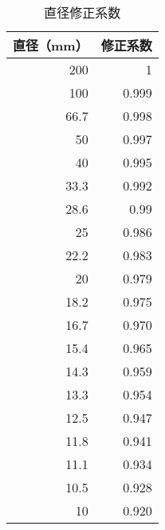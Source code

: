 \documentclass[12pt]{ctexart}
\begin{document}
\newpage
\begin{table}[h]
	\centering
	\caption{直径修正系数}
	\label{tab:diamension correction factors}
	\begin{tabular}{|r|r|}
	\hline
	\textbf{直径（mm）}   & \textbf{修正系数}  \\ \hline
	200  & 1     \\ \hline
	100  & 0.999 \\ \hline
	66.7 & 0.998 \\ \hline
	50   & 0.997 \\ \hline
	40   & 0.995 \\ \hline
	33.3 & 0.992 \\ \hline
	28.6 & 0.99  \\ \hline
	25   & 0.986 \\ \hline
	22.2 & 0.983 \\ \hline
	20   & 0.979 \\ \hline
	18.2 & 0.975 \\ \hline
	16.7 & 0.970 \\ \hline
	15.4 & 0.965 \\ \hline
	14.3 & 0.959 \\ \hline
	13.3 & 0.954 \\ \hline
	12.5 & 0.947 \\ \hline
	11.8 & 0.941 \\ \hline
	11.1 & 0.934 \\ \hline
	10.5 & 0.928 \\ \hline
	10   & 0.920 \\ \hline
	\end{tabular}
\end{table}
\end{document}
